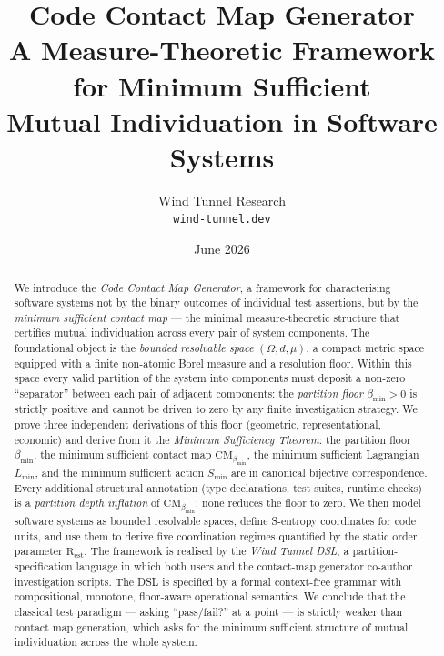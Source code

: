 \documentclass[12pt,a4paper,twocolumn]{article}
\title{\textbf{Code Contact Map Generator}\\[4pt]
  {\large A Measure-Theoretic Framework for Minimum Sufficient\\
  Mutual Individuation in Software Systems}}
\author{Wind Tunnel Research\\[4pt]
  \small \texttt{wind-tunnel.dev}}
\date{June 2026}
\theoremstyle{plain}
\theoremstyle{definition}
\theoremstyle{remark}
\newcommand{\CM}{\mathrm{CM}}
\newcommand{\bmin}{\beta_{\min}}
\newcommand{\Rest}{\mathrm{R}_{\mathrm{est}}}
\newcommand{\Lmin}{L_{\min}}
\newcommand{\Smin}{S_{\min}}
\newcommand{\CMbmin}{\CM_{\bmin}}
\newcommand{\BRS}{(\Omega,d,\mu)}
\begin{document}

\maketitle

\begin{abstract}
We introduce the \emph{Code Contact Map Generator}, a framework for
characterising software systems not by the binary outcomes of individual test
assertions, but by the \emph{minimum sufficient contact map} --- the minimal
measure-theoretic structure that certifies mutual individuation across every
pair of system components.  The foundational object is the \emph{bounded
resolvable space} $\BRS$, a compact metric space equipped with a finite
non-atomic Borel measure and a resolution floor.  Within this space every
valid partition of the system into components must deposit a non-zero
``separator'' between each pair of adjacent components: the \emph{partition
floor} $\bmin > 0$ is strictly positive and cannot be driven to zero by any
finite investigation strategy.  We prove three independent derivations of this
floor (geometric, representational, economic) and derive from it the
\emph{Minimum Sufficiency Theorem}: the partition floor $\bmin$, the minimum
sufficient contact map $\CMbmin$, the minimum sufficient Lagrangian $\Lmin$,
and the minimum sufficient action $\Smin$ are in canonical bijective
correspondence.  Every additional structural annotation (type declarations,
test suites, runtime checks) is a \emph{partition depth inflation} of
$\CMbmin$; none reduces the floor to zero.  We then model software systems
as bounded resolvable spaces, define S-entropy coordinates for code units, and
use them to derive five coordination regimes quantified by the static order
parameter $\Rest$.  The framework is realised by the \emph{Wind Tunnel DSL},
a partition-specification language in which both users and the contact-map
generator co-author investigation scripts.  The DSL is specified by a formal
context-free grammar with compositional, monotone, floor-aware operational
semantics.  We conclude that the classical test paradigm --- asking
``pass/fail?'' at a point --- is strictly weaker than contact map generation,
which asks for the minimum sufficient structure of mutual individuation across
the whole system.
\end{abstract}
\end{document}
